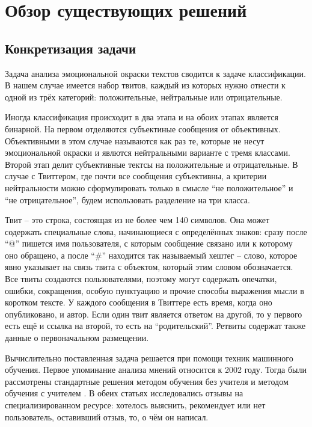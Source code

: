 \chapter{Обзор существующих решений}

\section{Конкретизация задачи}
Задача анализа эмоциональной окраски текстов сводится к задаче классификации. В
нашем случае имеется набор твитов, каждый из которых нужно отнести к одной из
трёх категорий: положительные, нейтральные или отрицательные.

Иногда классификация происходит в два этапа и на обоих этапах является бинарной.
На первом отделяются субъектиные сообщения от объективных. Объективными в этом
случае называются как раз те, которые не несут эмоциональной окраски и
явлются нейтральными варианте с тремя классами. Второй этап делит субъективные
тектсы на положительные и отрицательные. В случае с Твиттером, где почти все
сообщения субъективны, а критерии нейтральности можно сформулировать только в
смысле ``не положительное'' и ``не отрицательное'', будем использовать разделение
на три класса.

Твит -- это строка, состоящая из не более чем 140 символов. Она может содержать
специальные слова, начинающиеся с определённых знаков: сразу после ``@'' пишется
имя пользователя, с которым сообщение связано или к которому оно обращено,
а после ``\#'' находится так называемый хештег -- слово, которое явно указывает
на связь твита с объектом, который этим словом обозначается. Все твиты создаются
пользователями, поэтому могут содержать опечатки, ошибки, сокращения,
особую пунктуацию и прочие способы выражения мысли в коротком тексте.
У каждого сообщения в Твиттере есть время, когда оно опубликовано, и автор.
Если один твит является ответом на другой, то у первого есть ещё и ссылка на второй,
то есть на ``родительский''. Ретвиты содержат также данные о первоначальном
размещении.

Вычислительно поставленная задача решается при помощи техник машинного обучения. Первое
упоминание анализа мнений относится к 2002 году. Тогда были рассмотрены
стандартные решения методом обучения без учителя \cite{turney2002thumbs} и методом обучения с
учителем \cite{pang2002thumbs}. В обеих статьях исследовались отзывы на
специализированном ресурсе: хотелось выяснить, рекомендует или нет пользователь, оставивший отзыв,
то, о чём он написал.

